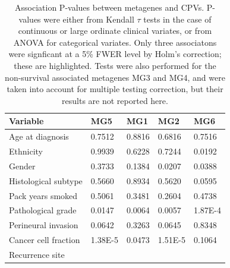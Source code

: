 \documentclass[dissertation.tex]{subfiles}
\begin{document}
\begin{table}[h]
\caption{Association P-values between metagenes and \glspl{CPV}.  P-values were either from Kendall $\tau$ tests in the case of continuous or large ordinate clinical variates, or from ANOVA for categorical variates.  Only three associatons were signficant at a 5\% FWER level by Holm's correction; these are highlighted.  Tests were also performed for the non-survival associated metagenes MG3 and MG4, and were taken into account for multiple testing correction, but their results are not reported here.\label{tab:sigs-mg-cpvs}}
\center
\begin{tabular}{@{}l@{\qquad}ll@{\qquad\quad}ll@{}}
\toprule
Variable                   & MG5                             & MG1    & MG2                             & MG6                             \\ \midrule
Age at diagnosis           & 0.7512                          & 0.8816 & 0.6816                          & 0.7516                          \\
Ethnicity                  & 0.9939                          & 0.6228 & 0.7244                          & 0.0192                          \\
Gender                     & 0.3733                          & 0.1384 & 0.0207                          & 0.0388                          \\
Histological subtype       & 0.5660                          & 0.8934 & 0.5620                          & 0.0595                          \\
Pack years smoked          & 0.5061                          & 0.3481 & 0.2604                          & 0.4738                          \\
Pathological grade         & 0.0147                          & 0.0064 & 0.0057                          & \cellcolor[HTML]{C0C0C0}1.87E-4 \\
Perineural invasion        & 0.0642                          & 0.3263 & 0.0645                          & 0.8348                          \\
Cancer cell fraction       & \cellcolor[HTML]{C0C0C0}1.38E-5 & 0.0473 & \cellcolor[HTML]{C0C0C0}1.51E-5 & 0.1064                          \\
Recurrence site            &                                 &        &                                 &                                 \\

\end{tabular}
\end{table}
\end{document}
